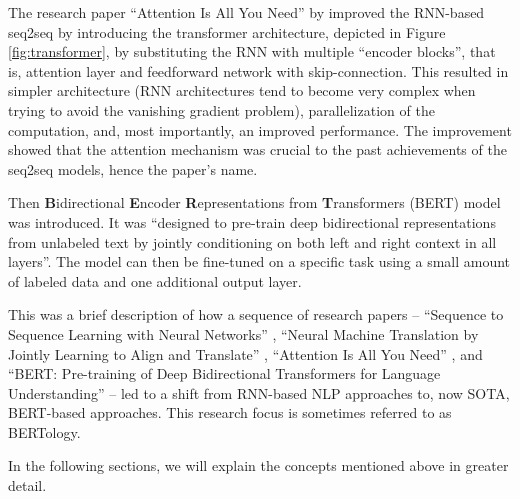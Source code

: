 The research paper ``Attention Is All You Need'' by \citet{attention-is-all-you-need} improved the RNN-based seq2seq by introducing the transformer architecture, depicted in Figure \ref{fig:transformer}, by substituting the RNN with multiple ``encoder blocks'', that is, attention layer and feedforward network with skip-connection. 
This resulted in simpler architecture (RNN architectures tend to become very complex when trying to avoid the vanishing gradient problem), parallelization of the computation, and, most importantly, an improved performance. 
The improvement showed that the attention mechanism was crucial to the past achievements of the seq2seq models, hence the paper's name.

Then \textbf{B}idirectional \textbf{E}ncoder \textbf{R}epresentations from \textbf{T}ransformers (BERT) \citep{bert} model was introduced. It was ``designed to pre-train deep bidirectional representations from unlabeled text by jointly conditioning on both left and right context in all layers''. 
The model can then be fine-tuned on a specific task using a small amount of labeled data and one additional output layer. 

This was a brief description of how a sequence of research papers -- ``Sequence to Sequence Learning with Neural Networks'' \citep{seq2seq}, ``Neural Machine Translation by Jointly Learning to Align and Translate'' \citep{first-attention}, ``Attention Is All You Need'' \citep{attention-is-all-you-need}, and ``BERT: Pre-training of Deep Bidirectional Transformers for Language Understanding'' \citep{bert} -- led to a shift from RNN-based NLP approaches to, now SOTA, BERT-based approaches.
This research focus is sometimes referred to as BERTology.

In the following sections, we will explain the concepts mentioned above in greater detail.

